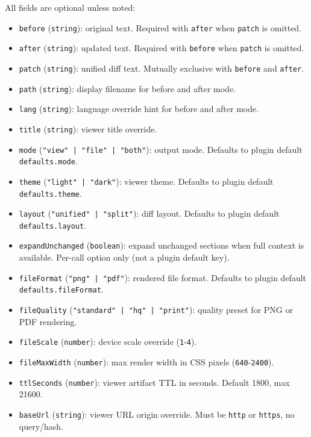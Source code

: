 All fields are optional unless noted:

\begin{itemize}
  \item \texttt{before} (\texttt{string}): original text. Required with \texttt{after} when \texttt{patch} is omitted.
  \item \texttt{after} (\texttt{string}): updated text. Required with \texttt{before} when \texttt{patch} is omitted.
  \item \texttt{patch} (\texttt{string}): unified diff text. Mutually exclusive with \texttt{before} and \texttt{after}.
  \item \texttt{path} (\texttt{string}): display filename for before and after mode.
  \item \texttt{lang} (\texttt{string}): language override hint for before and after mode.
  \item \texttt{title} (\texttt{string}): viewer title override.
  \item \texttt{mode} (\texttt{"view" | "file" | "both"}): output mode. Defaults to plugin default \texttt{defaults.mode}.
  \item \texttt{theme} (\texttt{"light" | "dark"}): viewer theme. Defaults to plugin default \texttt{defaults.theme}.
  \item \texttt{layout} (\texttt{"unified" | "split"}): diff layout. Defaults to plugin default \texttt{defaults.layout}.
  \item \texttt{expandUnchanged} (\texttt{boolean}): expand unchanged sections when full context is available. Per-call option only (not a plugin default key).
  \item \texttt{fileFormat} (\texttt{"png" | "pdf"}): rendered file format. Defaults to plugin default \texttt{defaults.fileFormat}.
  \item \texttt{fileQuality} (\texttt{"standard" | "hq" | "print"}): quality preset for PNG or PDF rendering.
  \item \texttt{fileScale} (\texttt{number}): device scale override (\texttt{1}-\texttt{4}).
  \item \texttt{fileMaxWidth} (\texttt{number}): max render width in CSS pixels (\texttt{640}-\texttt{2400}).
  \item \texttt{ttlSeconds} (\texttt{number}): viewer artifact TTL in seconds. Default 1800, max 21600.
  \item \texttt{baseUrl} (\texttt{string}): viewer URL origin override. Must be \texttt{http} or \texttt{https}, no query/hash.
\end{itemize}



